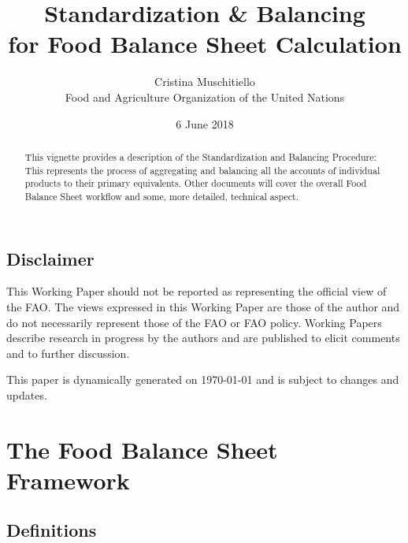 \documentclass[]{article}
\title{Standardization \& Balancing\\
for Food Balance Sheet Calculation}
\author{Cristina Muschitiello\\
Food and Agriculture Organization of the United Nations}
\date{6 June 2018}
\begin{document}
\maketitle
\begin{abstract}
This vignette provides a description of the Standardization and
Balancing Procedure: This represents the process of aggregating and
balancing all the accounts of individual products to their primary
equivalents. Other documents will cover the overall Food Balance Sheet
workflow and some, more detailed, technical aspect.
\end{abstract}

{
\setcounter{tocdepth}{4}
\tableofcontents
}
\newpage

\listoftables

\listoffigures

\newpage

\subsection*{Disclaimer}\label{disclaimer}

This Working Paper should not be reported as representing the official
view of the FAO. The views expressed in this Working Paper are those of
the author and do not necessarily represent those of the FAO or FAO
policy. Working Papers describe research in progress by the authors and
are published to elicit comments and to further discussion.

This paper is dynamically generated on \today{} and is subject to
changes and updates.

\section*{The Food Balance Sheet
Framework}\label{the-food-balance-sheet-framework}

\subsection*{Definitions}\label{definitions}
\end{document}
